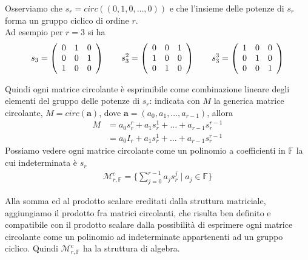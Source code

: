 \noindent
Osserviamo che $s_{r} = circ((0,1,0, \dots, 0))$ e che l'insieme delle potenze
di $s_{r}$ forma un gruppo ciclico di ordine $r$. \\
Ad esempio per $r=3$ si ha
\begin{align*}
s_3 = 
\left(
\begin{array} {c c c  }
0 & 1 &  0   \\
0 & 0 & 1   \\
1 & 0 & 0   \\     
\end{array}
\right)
\qquad
s_3^2 = 
\left(
\begin{array} {c c c  }
0 & 0 & 1   \\
1 & 0 & 0   \\
0 & 1 & 0   \\     
\end{array}
\right)
\qquad
s_3^3 = 
\left(
\begin{array} {c c c  }
1 & 0 & 0   \\
0 & 1 & 0   \\
0 & 0 & 1   \\     
\end{array}
\right)
\end{align*}

\noindent
Quindi ogni matrice circolante è esprimibile
come combinazione lineare degli elementi del gruppo delle potenze di $s_r$:
indicata con $M$ la generica matrice circolante, $M = circ( \mathbf{a} )
$, dove $\mathbf{a} = (a_0, a_1, \dots, a_{r-1} )$, allora
\begin{align*}
M &= a_0  s_{r}^{r} + a_1  s_{r}^{1} + \dots + a_{r-1} s_{r}^{r-1} \\
&= a_0  I_{r} + a_1  s_{r}^{1} + \dots + a_{r-1}  s_{r}^{r-1}
\end{align*}
Possiamo vedere ogni matrice circolante come un
polinomio a coefficienti in $\mathbb{F}$ la cui indeterminata è $s_{r}$
\begin{align*}
\mathcal{M}_{r,\mathbb{F} }^{c} = \lbrace \sum_{j=0}^{r-1} a_{j}s_{r}^{j} \mid
a_{j}
\in \mathbb{F} \rbrace
\end{align*}

\noindent
Alla somma ed al prodotto scalare ereditati dalla struttura matriciale,
aggiungiamo il prodotto fra matrici circolanti, che risulta
ben definito e compatibile con il prodotto scalare dalla possibilità di esprimere
ogni matrice circolante come un polinomio ad indeterminate appartenenti ad un
gruppo ciclico.
Quindi $\mathcal{M}_{r,\mathbb{F}}^{c}$ ha la struttura di algebra.


